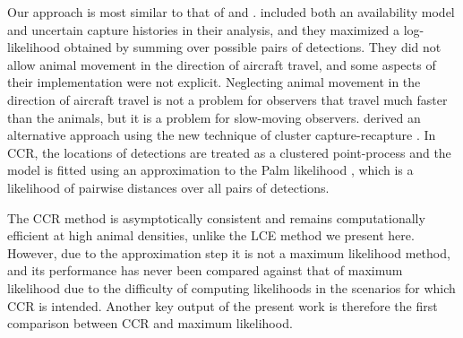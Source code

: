 \documentclass[useAMS, usenatbib, referee]{biom}\usepackage[]{graphicx}\usepackage[]{color}
\begin{document}
Our approach is most similar to that of \cite{Hiby+Lovell:98} and \cite{Stevenson+al:19}.  \cite{Hiby+Lovell:98} included both an availability model and uncertain capture histories in their analysis, and they maximized a log-likelihood obtained by summing over possible pairs of detections. They did not allow animal movement in the direction of aircraft travel, and some aspects of their implementation were not explicit. Neglecting animal movement in the direction of aircraft travel is not a problem for observers that travel much faster than the animals, but it is a problem for slow-moving observers. \cite{Stevenson+al:19} derived an alternative approach using the new technique of cluster capture-recapture \citep[CCR; see ][]{Fewster+al:16}. In CCR, the locations of detections are treated as a clustered point-process and the model is fitted using an approximation to the Palm likelihood \citep{Tanaka+al:08}, which is a likelihood of pairwise distances over all pairs of detections.

The CCR method is asymptotically consistent and remains computationally efficient at high animal densities, unlike the LCE method we present here. However, due to the approximation step it is not a maximum likelihood method, and its performance has never been compared against that of maximum likelihood due to the difficulty of computing likelihoods in the scenarios for which CCR is intended. Another key output of the present work is therefore the first comparison between CCR and maximum likelihood.

\end{document}
